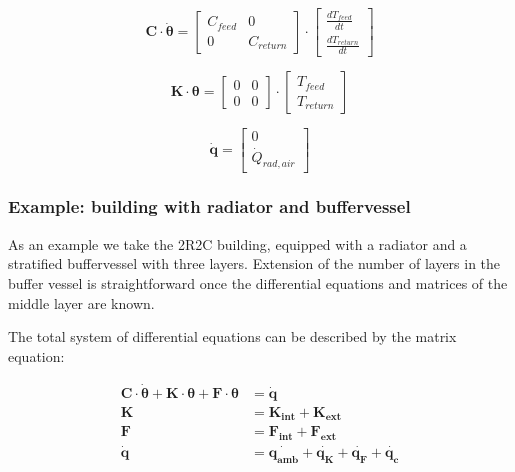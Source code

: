 \begin{equation}
	\mathbf{C} \cdot \boldsymbol{\dot{\theta}} =
	\begin{bmatrix}
		C_{feed} & 0 \\
		0 &  C_{return}
	\end{bmatrix}
	\cdot
	\begin{bmatrix}
		\frac{dT_{feed}}{dt} \\
		\frac{dT_{return}}{dt}
	\end{bmatrix}
\end{equation}

\begin{equation}
	\mathbf{K} \cdot \boldsymbol{\theta} =
	\begin{bmatrix}
		0 & 0 \\
		0 &  0
	\end{bmatrix}
	\cdot
	\begin{bmatrix}
		T_{feed} \\
		T_{return}
	\end{bmatrix}
\end{equation}

\begin{equation}
	\mathbf{\dot{q}} =
	\begin{bmatrix}
		0 \\
		\dot{Q}_{rad, air}
	\end{bmatrix}
\end{equation}

\newpage


\newpage


\subsubsection{Example: building with radiator and buffervessel}

As an example we take the 2R2C building, equipped with a radiator and a stratified buffervessel with three layers. Extension of the number of layers in the buffer vessel is straightforward once the differential equations and matrices of the middle layer are known.

The total system of differential equations can be described by the matrix equation:

\begin{subequations}
	\label{app:eq:matexample}
	\begin{align}
		\mathbf{C} \cdot \boldsymbol{\dot{\theta}} + \mathbf{K} \cdot \boldsymbol{\theta} + \mathbf{F} \cdot \boldsymbol{\theta} &= \mathbf{\dot{q}} \\
		\mathbf{K} &= \mathbf{K_{int}} + \mathbf{K_{ext}} \\
		\mathbf{F} &= \mathbf{F_{int}} + \mathbf{F_{ext}} \\
		\mathbf{\dot{q}} &= \mathbf{\dot{q_{amb}}} + \mathbf{\dot{q_{K}}} + \mathbf{\dot{q_{F}}} + \mathbf{\dot{q_{c}}}
	\end{align}
\end{subequations}

